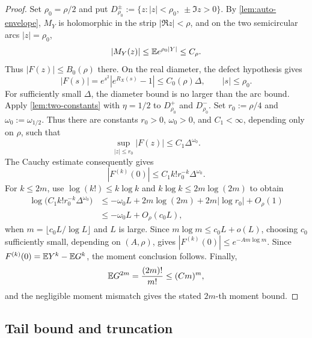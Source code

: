 \begin{proof}
Set $\rho_0=\rho/2$ and put $D_{\rho_0}^{\pm}:=\{z:|z|<\rho_0,\ \pm\Im z>0\}$. By \cref{lem:auto-envelope}, $M_Y$ is holomorphic in the strip $|\Re z|<\rho$, and on the two semicircular arcs $|z|=\rho_0$,
\[
|M_Y(z)|\le \mathbb E e^{\rho_0|Y|}\le C_\rho.
\]
Thus $|F(z)|\le B_0(\rho)$ there. On the real diameter, the defect hypothesis gives
\[
|F(s)|=e^{s^2}|e^{R_X(s)}-1|\le C_0(\rho)\Delta,
\qquad |s|\le\rho_0.
\]
For sufficiently small $\Delta$, the diameter bound is no larger than the arc bound. Apply \cref{lem:two-constants} with $\eta=1/2$ to $D_{\rho_0}^{+}$ and $D_{\rho_0}^{-}$. Set $r_0:=\rho/4$ and $\omega_0:=\omega_{1/2}$. Thus there are constants $r_0>0$, $\omega_0>0$, and $C_1<\infty$, depending only on $\rho$, such that
\[
\sup_{|z|\le r_0}|F(z)|\le C_1\Delta^{\omega_0}.
\]
The Cauchy estimate consequently gives
\[
|F^{(k)}(0)|\le C_1 k! r_0^{-k}\Delta^{\omega_0}.
\]
For $k\le2m$, use $\log(k!)\le k\log k$ and $k\log k\le2m\log(2m)$ to obtain
\[
\begin{aligned}
\log\bigl(C_1k!r_0^{-k}\Delta^{\omega_0}\bigr)
&\le -\omega_0L+2m\log(2m)+2m|\log r_0|+O_\rho(1)\\
&\le -\omega_0L+O_\rho(c_0L),
\end{aligned}
\]
when $m=\lfloor c_0L/\log L\rfloor$ and $L$ is large. Since $m\log m\le c_0L+o(L)$, choosing $c_0$ sufficiently small, depending on $(A,\rho)$, gives $|F^{(k)}(0)|\le e^{-Am\log m}$. Since $F^{(k)}(0)=\mathbb E Y^k-\mathbb E G^k$, the moment conclusion follows. Finally,
\[
\mathbb E G^{2m}=\frac{(2m)!}{m!}\le(Cm)^m,
\]
and the negligible moment mismatch gives the stated $2m$-th moment bound.
\end{proof}

\subsection{Tail bound and truncation}


